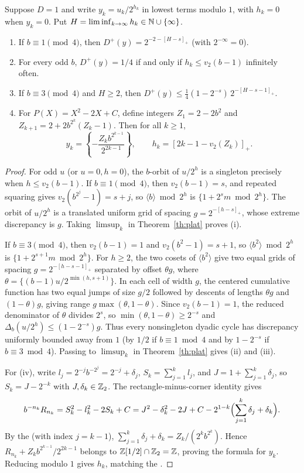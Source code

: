 \documentclass[11pt]{article}
\begin{document}
\begin{proposition}\label{th:dyadic}
Suppose $D=1$ and write $y_k=u_k/2^{h_k}$ in lowest terms modulo $1$, with $h_k=0$ when $y_k=0$. Put $H=\liminf_{k\to\infty} h_k\in\mathbb N\cup\{\infty\}$.
\begin{enumerate}[label=\textup{(\roman*)},leftmargin=2em,itemsep=2pt]
\item If $b\equiv1\pmod4$, then $D^+(y)=2^{-2-[H-s]_+}$ (with $2^{-\infty}=0$).
\item For every odd $b$, $D^+(y)=1/4$ if and only if $h_k\le v_2(b-1)$ infinitely often.
\item If $b\equiv3\pmod4$ and $H\ge2$, then $D^+(y)\le\frac14(1-2^{-s})\,2^{-[H-s-1]_+}$.
\item For $P(X)=X^2-2X+C$, define integers $Z_1=2-2b^2$ and $Z_{k+1}=2+2b^{2^k}(Z_k-1)$. Then for all $k\ge1$,
\[
 y_k=\left\{-\frac{Z_k b^{2^{k-1}}}{2^{2k-1}}\right\},\qquad
 h_k=[2k-1-v_2(Z_k)]_+ .
\]
\end{enumerate}
\end{proposition}
\begin{proof}
For odd $u$ (or $u=0,h=0$), the $b$-orbit of $u/2^h$ is a singleton precisely when $h\le v_2(b-1)$. If $b\equiv1\pmod4$, then $v_2(b-1)=s$, and repeated squaring gives $v_2(b^{2^j}-1)=s+j$, so $\langle b\rangle\bmod 2^h$ is $\{1+2^s m\bmod 2^h\}$. The orbit of $u/2^h$ is a translated uniform grid of spacing $g=2^{-[h-s]_+}$, whose extreme discrepancy is $g$. Taking $\limsup_k$ in Theorem~\ref{th:plat} proves (i).

If $b\equiv3\pmod4$, then $v_2(b-1)=1$ and $v_2(b^2-1)=s+1$, so $\langle b^2\rangle\bmod 2^h$ is $\{1+2^{s+1}m\bmod 2^h\}$. For $h\ge2$, the two cosets of $\langle b^2\rangle$ give two equal grids of spacing $g=2^{-[h-s-1]_+}$ separated by offset $\theta g$, where $\theta=\{(b-1)u/2^{\min(h,s+1)}\}$. In each cell of width $g$, the centered cumulative function has two equal jumps of size $g/2$ followed by descents of lengths $\theta g$ and $(1-\theta)g$, giving range $g\max(\theta,1-\theta)$. Since $v_2(b-1)=1$, the reduced denominator of $\theta$ divides $2^s$, so $\min(\theta,1-\theta)\ge2^{-s}$ and $\Delta_b(u/2^h)\le(1-2^{-s})g$. Thus every nonsingleton dyadic cycle has discrepancy uniformly bounded away from $1$ (by $1/2$ if $b\equiv1\bmod4$ and by $1-2^{-s}$ if $b\equiv3\bmod4$). Passing to $\limsup_k$ in Theorem~\ref{th:plat} gives (ii) and (iii).

For (iv), write $l_j=2^{-j}b^{-2^j}=2^{-j}+\delta_j$, $S_k=\sum_{j=1}^k l_j$, and $J=1+\sum_{j=1}^k\delta_j$, so $S_k=J-2^{-k}$ with $J,\delta_k\in\mathbb Z_2$. The rectangle-minus-corner identity gives
\[
 b^{-n_k}R_{n_k}=S_k^2-l_k^2-2S_k+C
 =J^2-\delta_k^2-2J+C-2^{1-k}\Bigl(\sum_{j=1}^k\delta_j+\delta_k\Bigr).
\]
By the  (with index $j=k-1$), $\sum_{j=1}^k\delta_j+\delta_k=Z_k/(2^k b^{2^k})$. Hence $R_{n_k}+Z_k b^{2^{k-1}}/2^{2k-1}$ belongs to $\mathbb Z[1/2]\cap\mathbb Z_2=\mathbb Z$, proving the formula for $y_k$. Reducing modulo $1$ gives $h_k$, matching the .
\end{proof}
\end{document}
